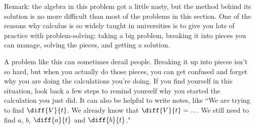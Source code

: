 \begin{solution}
Remark: the algebra in this problem got a little nasty, but the method behind its solution is no more difficult than most of the problems in this section. One of the reasons why calculus is so widely taught in universities is to give you lots of practice with problem-solving: taking a big problem, breaking it into pieces you can manage, solving the pieces, and getting a solution.

A problem like this can sometimes derail people. Breaking it up into pieces isn't so hard, but when you actually do those pieces, you can get confused and forget why you are doing the calculations you're doing. If you find yourself in this situation, look back a few steps to remind yourself why you started the calculation you just did. It can also be helpful to write notes, like
``We are trying to find $\diff{V}{t}$. We already know that
                $\diff{V}{t} = ...$. We still need to find $a$, $b$,
                $\diff{a}{t}$ and $\diff{b}{t}$."

\begin{comment}
Remark: here is a check on the reasonableness of our answer.
\begin{itemize}
\item 
The circumference of the original circular cross section is $2\pi(5)=10\pi
\approx 31.4\mathrm{cm}$. When $a$ hits 
$\frac{10\pi}{4}\approx 7.9\mathrm{cm}$, the bottle is completely flattened
and so has volume $0$. This happens at time $t=7.9-5=2.9\mathrm{sec}$.
\item
The original bottle has volume $20\times \pi(5^2)\approx 1571\mathrm{cm}^3$.
\item
So, on average, the volume decreased at a rate of $\frac{1571}{2.9}
=542\frac{\mathrm{cm}^3}{\mathrm{sec}}$
\end{itemize}
\end{comment}
\end{solution}



